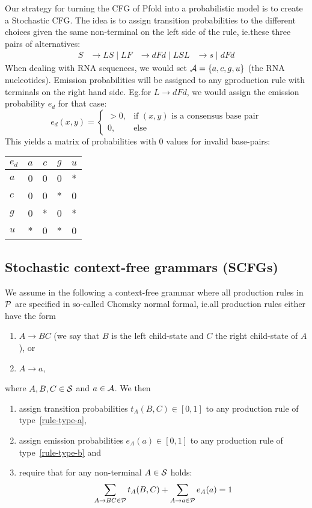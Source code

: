 Our strategy for turning the CFG of Pfold into a probabilistic model is to
create a Stochastic CFG.  The idea is to assign transition probabilities to
the different choices given the same non-terminal on the left side of the rule,
ie.\@ these three pairs of alternatives:
\begin{align}
  S &\to LS \mid L
  F &\to dFd \mid LS
  L &\to s \mid dFd
\end{align}
When dealing with RNA sequences, we would set \(\mathcal{A}=\{a,c,g,u\}\)
(the RNA nucleotides).  Emission probabilities will be assigned to any
gproduction rule with terminals on the right hand side.  Eg.\@ for \(L\to dFd\),
we would assign the emission probability \(e_d\) for that case:
\[
  e_d(x,y) = \begin{cases}
      >0, &\text{if \((x,y)\) is a consensus base pair} \\
      0, &\text{else}
  \end{cases}
\]
This yields a matrix of probabilities with \(0\) values for invalid base-pairs:
\begin{table}[H]
\centering
\begin{tabular}{l|cccc}
    $e_d$ & $a$ & $c$ & $g$ & $u$ \\
    \hline 
    $a$   & 0   & 0   & 0   & *   \\
    $c$   & 0   & 0   & *   & 0   \\
    $g$   & 0   & *   & 0   & *   \\
    $u$   & *   & 0   & *   & 0
\end{tabular}
\end{table}

\subsection{Stochastic context-free grammars (SCFGs)}

We assume in the following a context-free grammar where all production rules in
\(\mathcal{P}\) are specified in so-called Chomsky normal formal, ie.\@ all
production rules either have the form
\begin{enumerate}[label=(\alph*)]
\item\label{rule-type-a} \(A\to BC\) (we say that \(B\) is the left child-state
  and \(C\) the right child-state of \(A\)), or
\item\label{rule-type-b} \(A\to a\),
\end{enumerate}
where \(A,B,C\in\mathcal{S}\) and \(a\in\mathcal{A}\).  We then
\begin{enumerate}[label=\arabic*.]
\item assign transition probabilities \(t_A(B,C)\in[0,1]\) to any production
  rule of type~\ref{rule-type-a},
\item assign emission probabilities \(e_A(a)\in[0,1]\) to any production rule of
  type~\ref{rule-type-b} and
\item require that for any non-terminal \(A\in\mathcal{S}\) holds:
  \[
    \sum_{A\to BC\in\mathcal{P}} t_A(B,C) + \sum_{A\to a\in\mathcal{P}} e_A(a) = 1
  \]
\end{enumerate}


